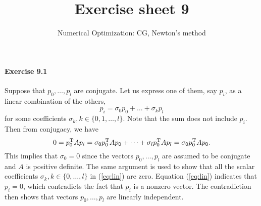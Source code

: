 
\title{Exercise sheet 9}
\subtitle{Numerical Optimization: CG, Newton's method}

\maketitle

\paragraph{Exercise 9.1}  %
Suppose that $p_0,\dots,p_l$ are conjugate. Let us express one of them, say
$p_i$, as a linear combination of the others,
\begin{equation}\label{eq:lin}
p_i = \sigma_0 p_0 + \dots + \sigma_k p_l
\end{equation}
for some coefficients $\sigma_k, k\in\{0, 1, \dots, l\}$. Note that the sum does not include $p_i$. Then from conjugacy, we have
\[
0
= p_0^{\text{\upshape T}} A p_i
= \sigma_0 p_0^{\text{\upshape T}} A p_0 + \dots + \sigma_l p_0^{\text{\upshape T}} A p_l
= \sigma_0 p_0^{\text{\upshape T}} A p_0.
\]
This implies that $\sigma_0 = 0$ since the vectors $p_0, \dots, p_l$ are
assumed to be conjugate and $A$ is positive definite. The same argument is
used to show that all the scalar coefficients $\sigma_k, k\in\{0,\dots,l\}$ in
(\ref{eq:lin}) are zero. Equation (\ref{eq:lin}) indicates that $p_i = 0$,
which contradicts the fact that $p_i$ is a nonzero vector. The contradiction
then shows that vectors $p_0,\dots, p_l$ are linearly independent.



